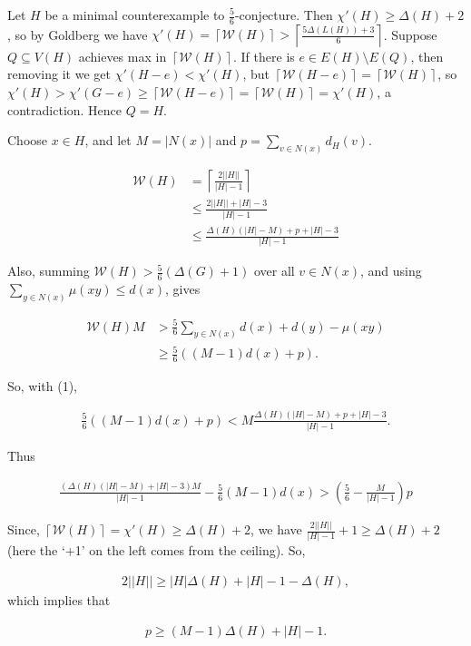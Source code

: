 \documentclass[12pt]{amsart}
\theoremstyle{plain}
\theoremstyle{definition}
\theoremstyle{remark}
\newcommand{\fancy}[1]{\mathcal{#1}}
\newcommand{\W}{\fancy{W}}
\newcommand{\ceil}[1]{\left\lceil#1\right\rceil}
\begin{document}
Let $H$ be a minimal counterexample to $\frac56$-conjecture. Then $\chi'(H) \ge
\Delta(H) + 2$, so by Goldberg we have $\chi'(H) = \ceil{\W(H)} >
\ceil{\frac{5\Delta(L(H)) + 3}6}$.  Suppose $Q \subseteq V(H)$ achieves max in
$\ceil{\W(H)}$.  If there is $e \in E(H) \setminus E(Q)$, then removing it we get
$\chi'(H-e) < \chi'(H)$, but $\ceil{\W(H-e)} = \ceil{\W(H)}$, so  $\chi'(H) >
\chi'(G-e) \ge \ceil{\W(H-e)} =  \ceil{\W(H)} = \chi'(H)$, a contradiction. Hence $Q
= H$.

Choose $x \in H$, and let $M = |N(x)|$ and $p = \sum_{v \in N(x)} d_H(v)$.

\begin{align}
\W(H) & = \ceil{\frac{2||H||}{|H| - 1}} \\
& \le \frac{2||H|| + |H| - 3}{|H|-1}  \nonumber \\
& \le \frac{\Delta(H)(|H| - M) + p + |H| - 3}{|H|-1} \nonumber
\end{align}

Also, summing $\W(H) > \frac56(\Delta(G) + 1)$ over all $v \in N(x)$, and using
$\sum_{y\in N(x)}\mu(xy)\le d(x)$, gives

\begin{align}
\W(H)M & >  \frac56\sum_{y\in N(x)}d(x)+d(y)-\mu(xy) \nonumber \\
& \ge \frac56((M-1)d(x) + p).
\end{align}

So, with (1),

\begin{align*}
 \frac56((M-1)d(x) + p) <  M\frac{\Delta(H)(|H| - M) + p + |H| - 3}{|H|-1}.
\end{align*}

Thus

\begin{align}
\frac{(\Delta(H)(|H| - M) + |H| - 3)M}{|H| - 1} - \frac56(M-1)d(x) > \left(\frac56 -
\frac{M}{|H| - 1}\right)p
\end{align}

Since,
$\ceil{\W(H)} = \chi'(H) \ge \Delta(H) + 2$, we have
$\frac{2||H||}{|H| - 1} + 1 \ge \Delta(H) + 2$ (here the `+1' on the left comes
from the ceiling).
So,

\begin{align*}
2||H|| \ge |H|\Delta(H) + |H| - 1 - \Delta(H),
\end{align*}
which implies that

\begin{align}
p \ge (M-1)\Delta(H) + |H| - 1.
\end{align}
\end{document}
